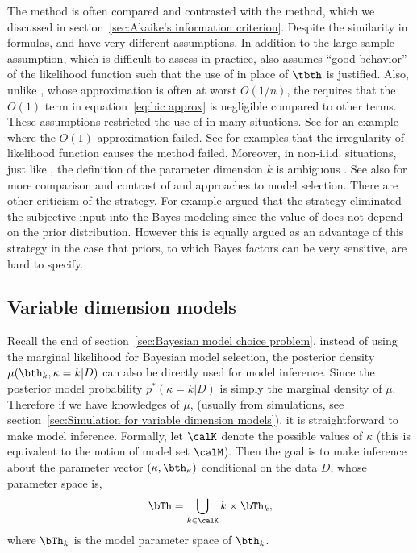 The \bic method is often compared and contrasted with the \aic method, which
we discussed in section~\ref{sec:Akaike's information criterion}. Despite the
similarity in formulas, \aic and \bic have very different assumptions. In
addition to the large sample assumption, which is difficult to assess in
practice, \bic also assumes ``good behavior'' of the likelihood function such
that the use of \mle in place of $\tbth$ is justified. Also, unlike \aic,
whose approximation is often at worst $O(1/n)$, the \bic requires that the
$O(1)$ term in equation~\eqref{eq:bic approx} is negligible compared to other
terms. These assumptions restricted the use of \bic in many situations. See
\textcite{Gelfand:1994ux} for an example where the $O(1)$ approximation failed.
See \textcite{Berger:2001uy} for examples that the irregularity of likelihood
function causes the \bic method failed. Moreover, in non-i.i.d. situations,
just like \aic, the definition of the parameter dimension $k$ is ambiguous
\parencite{Spiegelhalter:1998uc, Kass:1995vb}. See also \textcite[][chap.~5
and chap.~6]{Burnham:2002wc} for more comparison and contrast of \aic and \bic
approaches to model selection. There are other criticism of the \bic strategy.
For example \textcite[][chap.~7]{Robert:2007tc} argued that the \bic strategy
eliminated the subjective input into the Bayes modeling since the value of
\bic does not depend on the prior distribution. However this is equally argued
as an advantage of this strategy in the case that priors, to which Bayes
factors can be very sensitive, are hard to specify.

\subsection{Variable dimension models}
\label{sub:Variable dimension models}

Recall the end of section~\ref{sec:Bayesian model choice problem}, instead of
using the marginal likelihood for Bayesian model selection, the posterior
density $\mu(\bth_k,\kappa=k|D)$ can also be directly used for model
inference. Since the posterior model probability $p^*(\kappa=k|D)$ is simply
the marginal density of $\mu$. Therefore if we have knowledges of $\mu$,
(usually from simulations, see section~\ref{sec:Simulation for variable
  dimension models}), it is straightforward to make model inference. Formally,
let $\calK$ denote the possible values of $\kappa$ (this is equivalent to the
notion of model set $\calM$). Then the goal is to make inference about the
parameter vector $(\kappa, \bth_{\kappa})$ conditional on the data $D$, whose
parameter space is,
\begin{equation}
  \bTh = \bigcup_{k\in\calK}{k}\times\bTh_k,
  \label{eq:variable dimension parameter space}
\end{equation}
where $\bTh_k$ is the model parameter space of $\bth_k$.

